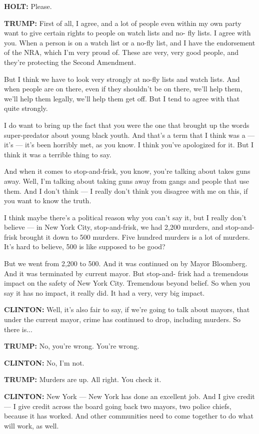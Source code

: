 \textbf{HOLT:} Please.

\textbf{TRUMP:} First of all, I agree, and a lot of people even within
my own party want to give certain rights to people on watch lists and
no- fly lists. I agree with you. When a person is on a watch list or a
no-fly list, and I have the endorsement of the NRA, which I'm very proud
of. These are very, very good people, and they're protecting the Second
Amendment.

But I think we have to look very strongly at no-fly lists and watch
lists. And when people are on there, even if they shouldn't be on there,
we'll help them, we'll help them legally, we'll help them get off. But I
tend to agree with that quite strongly.

I do want to bring up the fact that you were the one that brought up the
words super-predator about young black youth. And that's a term that I
think was a --- it's --- it's been horribly met, as you know. I think
you've apologized for it. But I think it was a terrible thing to say.

And when it comes to stop-and-frisk, you know, you're talking about
takes guns away. Well, I'm talking about taking guns away from gangs and
people that use them. And I don't think --- I really don't think you
disagree with me on this, if you want to know the truth.

I think maybe there's a political reason why you can't say it, but I
really don't believe --- in New York City, stop-and-frisk, we had 2,200
murders, and stop-and-frisk brought it down to 500 murders. Five hundred
murders is a lot of murders. It's hard to believe, 500 is like supposed
to be good?

But we went from 2,200 to 500. And it was continued on by Mayor
Bloomberg. And it was terminated by current mayor. But stop-and- frisk
had a tremendous impact on the safety of New York City. Tremendous
beyond belief. So when you say it has no impact, it really did. It had a
very, very big impact.

\textbf{CLINTON:} Well, it's also fair to say, if we're going to talk
about mayors, that under the current mayor, crime has continued to drop,
including murders. So there is...

\textbf{TRUMP:} No, you're wrong. You're wrong.

\textbf{CLINTON:} No, I'm not.

\textbf{TRUMP:} Murders are up. All right. You check it.

\textbf{CLINTON:} New York --- New York has done an excellent job. And I
give credit --- I give credit across the board going back two mayors,
two police chiefs, because it has worked. And other communities need to
come together to do what will work, as well.

